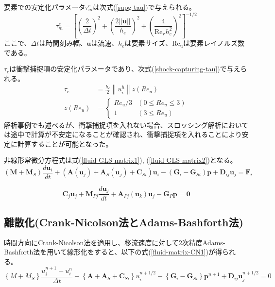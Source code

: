 要素での安定化パラメータ$\tau_{m}^{e}$は次式(\ref{supg-tau})で与えられる。
\begin{equation}
\label{supg-tau}
	\tau_{m}^{e}=\left[ \left(\frac{2}{\Delta t}\right)^{2} + \left(\frac{2||\bm{u}||}{h_{e}}\right)^{2} + \left(\frac{4}{\mathrm{Re_{v}} h_{e}^{2}}\right)^{2}\right]^{-1/2}
\end{equation}
ここで、$\Delta t$は時間刻み幅、$\bm{u}$は流速、$h_e$は要素サイズ、$\mathrm{Re_u}$は要素レイノルズ数である。

$\tau_{c}$は衝撃捕捉項の安定化パラメータであり、次式(\ref{shock-capturing-tau})で与えられる。
\begin{equation}
\label{shock-capturing-tau}
	\begin{aligned} 
		\tau_c & =\frac{h_e}{2}\left\|u_i^h\right\| z\left(R e_u\right) \\ z\left(R e_u\right) & = 
			\begin{cases}
				R e_u / 3 & \left(0 \leq R e_u \leq 3\right) \\ 
				1         & \left(3 \leq R e_u\right)
			\end{cases} 
	\end{aligned}
\end{equation}
解析事例でも述べるが、衝撃捕捉項を入れない場合、スロッシング解析においては途中で計算が不安定になることが確認され、衝撃捕捉項を入れることにより安定に計算することが可能となった。

非線形常微分方程式は式(\ref{fluid-GLS-matrix1}), (\ref{fluid-GLS-matrix2})となる。
\begin{equation}
\label{fluid-GLS-matrix1}
	\left(\bm{M}+\bm{M}_S\right) \frac{d \bm{u}_i}{d t} 
	+ \left(\bm{A}\left(\bm{u}_j\right) + \bm{A}_S\left(\bm{u}_j\right) + \bm{C}_{Si} \right) \bm{u}_i
	- \left(\bm{G}_i-\bm{G}_{S i}\right) \bm{p}
	+ \bm{D}_{i j} \bm{u}_j=\bm{F}_i
\end{equation}

\begin{equation}
\label{fluid-GLS-matrix2}
	\bm{C}_j \bm{u}_j+\bm{M}_{P j} \frac{d \bm{u}_j}{d t}
	+ \bm{A}_{P j}\left(\bm{u}_k\right) \bm{u}_j
	- \bm{G}_P \bm{p}=\mathbf{0}
\end{equation}

\subsection{離散化(Crank-Nicolson法とAdams-Bashforth法)}
時間方向にCrank-Nicolson法を適用し、移流速度に対して2次精度Adams-Bashforth法を用いて線形化をすると、以下の式(\ref{fluid-matrix-CN1})が得られる。
\begin{equation}
\label{fluid-matrix-CN1}
		\left\{M+M_S\right\} \frac{u_i^{n+1}-u_i^n}{\Delta t}
		+ \left\{\bm{A} + \bm{A}_S + \bm{C}_{Si}\right\} u_i^{n+1 / 2}
		- \left\{\bm{G}_i - \bm{G}_{S i}\right\} \bm{p}^{n+1}
		+ \bm{D}_{i j} \bm{u}_j^{n+1 / 2}
		= 0
\end{equation}

